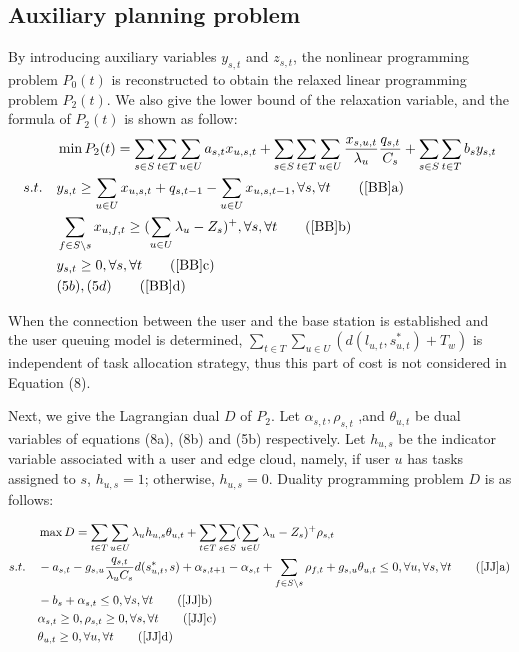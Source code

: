 \documentclass[journal,article,submit,pdftex,moreauthors]{Definitions/mdpi}
\begin{document}
\subsection {Auxiliary planning problem}
By introducing auxiliary variables $y_{s,t}$ and $z_{s,t}$, the nonlinear programming problem $P_0(t)$ is reconstructed to obtain the relaxed linear programming problem $P_2(t)$. We also give the lower bound of the relaxation variable, and the formula of $P_2(t)$ is shown as follow:
\begin{align}
&\min P_2(t)=\sum_{s\in S}\sum_{t\in T}\sum_{u\in U}a_{s,t}x_{u,s,t}+\sum_{s\in S}\sum_{t\in T}\sum_{u\in U}\frac{x_{s,u,t}}{\lambda_u}\frac{q_{s,t}}{C_s} +\sum_{s\in S}\sum_{t\in T}b_s y_{s,t} \label{BB}\\
s.t.\quad
&y_{s,t}\ge\sum_{u\in U}x_{u,s,t}+q_{s,t-1}-\sum_{u\in U}x_{u,s,t-1}, \forall s, \forall t  \tag{\ref{BB}{a}} \label{BBa}\\
&\sum_{f\in S\backslash s}x_{u,f,t}\ge (\sum_{u\in U}\lambda_{u}-Z_s)^{+},\forall s,\forall t \tag{\ref{BB}{b}} \label{BBb}\\
&y_{s,t}\ge 0, \forall s, \forall t \tag{\ref{BB}{c}} \label{BBc}\\
&(5b),(5d) \tag{\ref{BB}{d}} \label{BBd}
\end{align}

When the connection between the user and the base station is established and the user queuing model is determined, $\sum_{t \in T}\sum_{u\in U}(d(l_{u,t},s_{u,t}^*)+T_w)$ is independent of task allocation strategy, thus this part of cost is not considered in Equation (8).

 Next, we give the Lagrangian dual $D$ of $P_2$. Let $\alpha_{s,t},\rho_{s,t}$ ,and $\theta_{u,t}$ be dual variables of equations (8a), (8b) and (5b) respectively. Let $h_{u,s}$ be the indicator variable associated with a user and edge cloud, namely, if user $u$ has tasks assigned to $s$, $h_{u,s}=1$; otherwise, $h_{u,s} =0$. Duality programming problem $D$ is as follows:

\begin{align}
&\max D=\sum_{t\in T}\sum_{u\in U}\lambda_u h_{u,s}\theta_{u,t}+\sum_{t\in T}\sum_{s\in S}(\sum_{u\in U} \lambda_u-Z_s)^{+}\rho_{s,t}  \label{JJ}\\
s.t. \quad
&-a_{s,t}-g_{s,u}\frac{q_{s,t}}{\lambda_u C_s}d(s_{u,t}^{*},s)+\alpha_{s,t+1}-\alpha_{s,t}+\sum_{f\in S \backslash s}\rho_{f,t}+g_{s,u}\theta_{u,t}\le 0 ,\forall u, \forall s, \forall t \tag{\ref{JJ}{a}} \label{JJa}\\
&-b_s+\alpha_{s,t}\le 0 , \forall s, \forall t \tag{\ref{JJ}{b}} \label{JJb}\\
&\alpha_{s,t}\ge 0 , \rho_{s,t}\ge 0 ,\forall s, \forall t  \tag{\ref{JJ}{c}} \label{JJc}\\
&\theta_{u,t}\ge 0,\forall u, \forall t \tag{\ref{JJ}{d}} \label{JJd}
\end{align}
\end{document}
